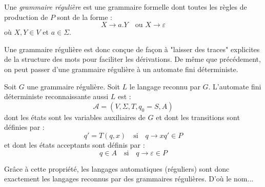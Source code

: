 \begin{definition}
    Une \emph{grammaire régulière} est une grammaire formelle dont toutes les règles de production de $P$ sont de la forme :
        \[ X \longrightarrow a.Y \quad \text{ou } X \longrightarrow \varepsilon \]
    où $X,Y \in V$ et $a \in \Sigma$.  
\end{definition}

Une grammaire régulière est donc conçue de façon à "laisser des traces" explicites de la structure des 
mots pour faciliter les dérivations. De même que précédement, on peut passer d'une grammaire régulière à un automate 
fini déterministe. 

\begin{proposition}
    Soit $G$ une grammaire régulière. Soit $L$ le langage reconnu par $G$.
    L'automate fini déterministe reconnaissante aussi $L$ est : 
        \[ \mathcal{A} = (V,\Sigma, T, q_0 = S, A) \] 
    dont les états sont les variables auxiliaires de $G$ et dont les transitions sont définies par : 
        \[ q' = T(q,x) \quad \text{si} \quad q \longrightarrow x q' \in P \] 
    et dont les états acceptants sont définis par :
        \[ q \in A \quad \text{si} \quad q \longrightarrow \varepsilon \in P \]  
\end{proposition}

\begin{remark}
    Grâce à cette propriété, les langages automatiques (réguliers) sont donc exactement les langages reconnus par des grammaires régulières. 
    D'où le nom...
\end{remark}

